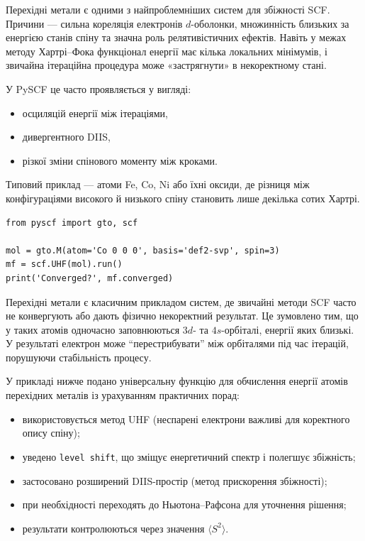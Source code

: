 Перехідні метали є одними з найпроблемніших систем для збіжності SCF.
Причини --- сильна кореляція електронів \(d\)-оболонки,
множинність близьких за енергією станів спіну та
значна роль релятивістичних ефектів.
Навіть у межах методу Хартрі–Фока
функціонал енергії має кілька локальних мінімумів,
і звичайна ітераційна процедура може «застрягнути» в некоректному стані.

У PySCF це часто проявляється у вигляді:
\begin{itemize}
    \item осциляцій енергії між ітераціями,
    \item дивергентного DIIS,
    \item різкої зміни спінового моменту між кроками.
\end{itemize}

Типовий приклад — атоми Fe, Co, Ni або їхні оксиди,
де різниця між конфігураціями високого й низького спіну
становить лише декілька сотих Хартрі.

\begin{verbatim}
from pyscf import gto, scf

mol = gto.M(atom='Co 0 0 0', basis='def2-svp', spin=3)
mf = scf.UHF(mol).run()
print('Converged?', mf.converged)
\end{verbatim}

Перехідні метали є класичним прикладом систем, де звичайні методи SCF часто не конвергують або дають фізично некоректний результат.
Це зумовлено тим, що у таких атомів одночасно заповнюються $3d$- та $4s$-орбіталі, енергії яких близькі. У результаті електрон може ``перестрибувати'' між орбіталями під час ітерацій, порушуючи стабільність процесу.

У прикладі нижче подано універсальну функцію для обчислення енергії атомів перехідних металів із урахуванням практичних порад:

\begin{itemize}
    \item використовується метод UHF (неспарені електрони важливі для коректного опису спіну);
    \item уведено \texttt{level shift}, що зміщує енергетичний спектр і полегшує збіжність;
    \item застосовано розширений DIIS-простір (метод прискорення збіжності);
    \item при необхідності переходять до Ньютона–Рафсона для уточнення рішення;
    \item результати контролюються через значення $\langle S^2 \rangle$.
\end{itemize}

